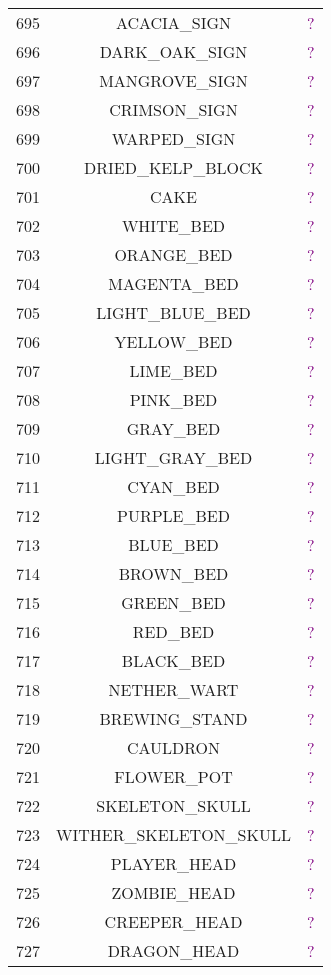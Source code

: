 \documentclass[11pt]{article}
\newcommand\myworries[1]{\textcolor{purple}{#1}}
\begin{document}
\begin{longtable}{ |c|c|c| }
	695 & ACACIA\_SIGN & \myworries{?} \\
	696 & DARK\_OAK\_SIGN & \myworries{?} \\
	697 & MANGROVE\_SIGN & \myworries{?} \\
	698 & CRIMSON\_SIGN & \myworries{?} \\
	699 & WARPED\_SIGN & \myworries{?} \\
	700 & DRIED\_KELP\_BLOCK & \myworries{?} \\
	701 & CAKE & \myworries{?} \\
	702 & WHITE\_BED & \myworries{?} \\
	703 & ORANGE\_BED & \myworries{?} \\
	704 & MAGENTA\_BED & \myworries{?} \\
	705 & LIGHT\_BLUE\_BED & \myworries{?} \\
	706 & YELLOW\_BED & \myworries{?} \\
	707 & LIME\_BED & \myworries{?} \\
	708 & PINK\_BED & \myworries{?} \\
	709 & GRAY\_BED & \myworries{?} \\
	710 & LIGHT\_GRAY\_BED & \myworries{?} \\
	711 & CYAN\_BED & \myworries{?} \\
	712 & PURPLE\_BED & \myworries{?} \\
	713 & BLUE\_BED & \myworries{?} \\
	714 & BROWN\_BED & \myworries{?} \\
	715 & GREEN\_BED & \myworries{?} \\
	716 & RED\_BED & \myworries{?} \\
	717 & BLACK\_BED & \myworries{?} \\
	718 & NETHER\_WART & \myworries{?} \\
	719 & BREWING\_STAND & \myworries{?} \\
	720 & CAULDRON & \myworries{?} \\
	721 & FLOWER\_POT & \myworries{?} \\
	722 & SKELETON\_SKULL & \myworries{?} \\
	723 & WITHER\_SKELETON\_SKULL & \myworries{?} \\
	724 & PLAYER\_HEAD & \myworries{?} \\
	725 & ZOMBIE\_HEAD & \myworries{?} \\
	726 & CREEPER\_HEAD & \myworries{?} \\
	727 & DRAGON\_HEAD & \myworries{?} \\

\end{longtable}
\end{document}
